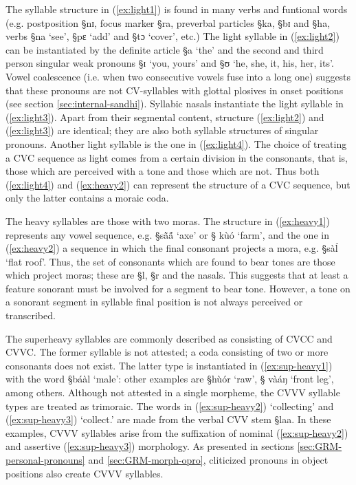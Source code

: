 
 The syllable structure in (\ref{ex:light1}) is  found in many verbs and
funtional words (e.g. postposition {\S nɪ}, focus marker {\S ra},
preverbal particles  {\S ka},  {\S bɪ} and {\S ha}, verbs {\S na} `see', 
{\S pɛ} `add' and  {\S tɔ} `cover', etc.) The light syllable in
(\ref{ex:light2}) can be instantiated by the definite article {\S a} `the' and
the
second and third person singular weak pronouns {\S ɪ} `you, yours'  and  {\S ʊ}
 `he, she, it, his, her, its'. Vowel
coalescence (i.e. when two consecutive vowels fuse into a long one) suggests
that these pronouns are not CV-syllables with glottal plosives in onset
positions  (see section \ref{sec:internal-sandhi}).  Syllabic
nasals instantiate the light syllable in (\ref{ex:light3}). Apart from
their segmental content, structure (\ref{ex:light2}) and (\ref{ex:light3}) are
identical; they are also both syllable structures of singular pronouns.  Another
light syllable is the one in (\ref{ex:light4}). The choice of treating a CVC
sequence as light comes from a certain division in the consonants,
that is,  those which are perceived with a tone and those which are not. Thus
both
(\ref{ex:light4}) and (\ref{ex:heavy2}) can represent the structure of a CVC
sequence, but only the latter contains a moraic coda.

The heavy syllables are those with two moras. The structure  in
(\ref{ex:heavy1}) represents any vowel sequence, e.g. {\S sã̀ã́} `axe' or {\S
kùó}  `farm', and the one in
(\ref{ex:heavy2}) a sequence in which the final
consonant projects a mora, e.g.  {\S sàĺ} `flat  roof'. Thus, the set of
consonants which are found to bear tones are those which project moras; these
are {\S l}, {\S r} and the nasals. This suggests  that at least a feature {\sc
sonorant}  must be involved for a segment to bear tone. However,  a tone on a
{\sc sonorant} segment in syllable final
position is not
always
perceived or transcribed.  

The superheavy syllables are commonly described as consisting of CVCC and CVVC.
The former syllable is not attested; a coda consisting of two or more consonants
does not exist. The latter type is instantiated in (\ref{ex:sup-heavy1}) with
 the word {\S báàl} `male':  other examples are {\S hùór} `raw',  {\S
vàáŋ} `front leg', among others.  Although not attested in a single
morpheme,
  the CVVV syllable types are treated as trimoraic. The words in
(\ref{ex:sup-heavy2}) `collecting'  and  (\ref{ex:sup-heavy3}) `collect.{\foc}'
are made from the verbal CVV stem {\S laa}. In these examples,  CVVV syllables
arise  from the suffixation of nominal (\ref{ex:sup-heavy2})
and assertive (\ref{ex:sup-heavy3}) morphology. As presented in sections
\ref{sec:GRM-personal-pronouns} and \ref{sec:GRM-morph-opro}, cliticized
pronouns in object positions also
create CVVV syllables.


